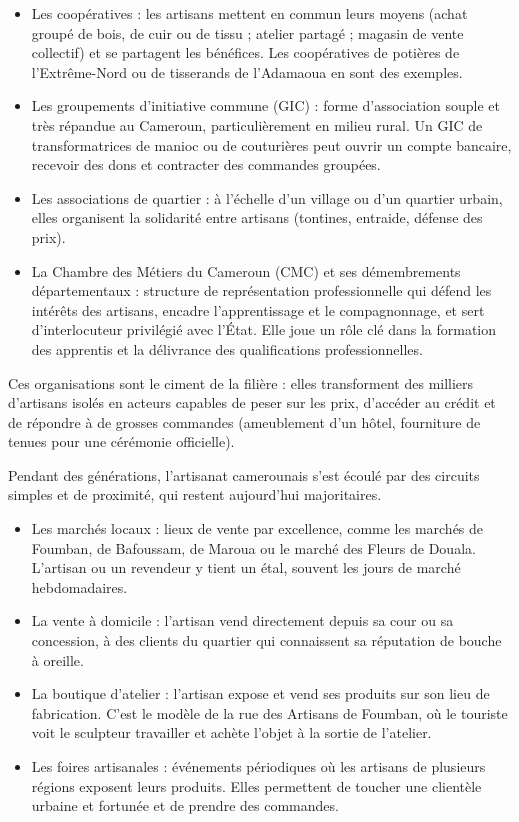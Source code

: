 \documentclass[11pt]{article}
\newcommand{\cle}[1]{{\popxbold\color{popdark}#1}}
\newcounter{popsec}
\newcounter{popsub}
\newcommand{\courssub}[1]{%
  \stepcounter{popsub}%
  \par\vspace{9pt}\noindent{\popxbold\fontsize{11.5}{13}\selectfont\color{popink}{\color{poporange}\thepopsec.\thepopsub}\hspace{6pt}#1}\par\nopagebreak\vspace{4pt}
}
\begin{document}
\begin{itemize}
\item Les \cle{coopératives} : les artisans mettent en commun leurs moyens (achat groupé de bois, de cuir ou de tissu ; atelier partagé ; magasin de vente collectif) et se partagent les bénéfices. Les coopératives de potières de l'Extrême-Nord ou de tisserands de l'Adamaoua en sont des exemples.
\item Les \cle{groupements d'initiative commune} (GIC) : forme d'association souple et très répandue au Cameroun, particulièrement en milieu rural. Un GIC de transformatrices de manioc ou de couturières peut ouvrir un compte bancaire, recevoir des dons et contracter des commandes groupées.
\item Les \cle{associations de quartier} : à l'échelle d'un village ou d'un quartier urbain, elles organisent la solidarité entre artisans (tontines, entraide, défense des prix).
\item La \cle{Chambre des Métiers du Cameroun (CMC)} et ses démembrements départementaux : structure de représentation professionnelle qui défend les intérêts des artisans, encadre l'apprentissage et le compagnonnage, et sert d'interlocuteur privilégié avec l'État. Elle joue un rôle clé dans la formation des apprentis et la délivrance des qualifications professionnelles.
\end{itemize}

Ces organisations sont le ciment de la filière : elles transforment des milliers d'artisans isolés en acteurs capables de peser sur les prix, d'accéder au crédit et de répondre à de grosses commandes (ameublement d'un hôtel, fourniture de tenues pour une cérémonie officielle).

\courssub{Les circuits de vente traditionnels}

Pendant des générations, l'artisanat camerounais s'est écoulé par des circuits simples et de proximité, qui restent aujourd'hui majoritaires.

\begin{itemize}
\item Les \cle{marchés locaux} : lieux de vente par excellence, comme les marchés de Foumban, de Bafoussam, de Maroua ou le marché des Fleurs de Douala. L'artisan ou un revendeur y tient un étal, souvent les jours de marché hebdomadaires.
\item La \cle{vente à domicile} : l'artisan vend directement depuis sa cour ou sa concession, à des clients du quartier qui connaissent sa réputation de bouche à oreille.
\item La \cle{boutique d'atelier} : l'artisan expose et vend ses produits sur son lieu de fabrication. C'est le modèle de la rue des Artisans de Foumban, où le touriste voit le sculpteur travailler et achète l'objet à la sortie de l'atelier.
\item Les \cle{foires artisanales} : événements périodiques où les artisans de plusieurs régions exposent leurs produits. Elles permettent de toucher une clientèle urbaine et fortunée et de prendre des commandes.
\end{itemize}
\end{document}
